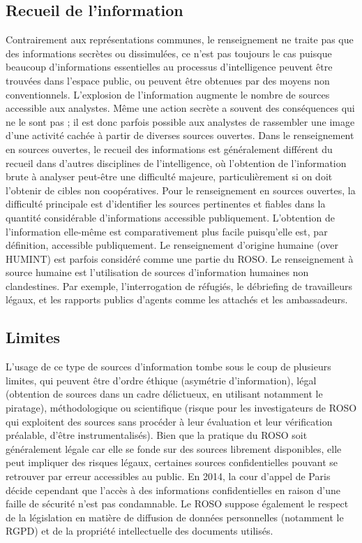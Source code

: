 \documentclass[french]{article}
\begin{document}
\subsection*{Recueil de l'information}
Contrairement aux représentations communes, le renseignement ne traite pas que des informations secrètes ou dissimulées, ce n'est pas toujours le cas puisque beaucoup d'informations essentielles au processus d'intelligence peuvent être trouvées dans l'espace public, ou peuvent être obtenues par des moyens non conventionnels. L'explosion de l'information augmente le nombre de sources accessible aux analystes. Même une action secrète a souvent des conséquences qui ne le sont pas ; il est donc parfois possible aux analystes de rassembler une image d'une activité cachée à partir de diverses sources ouvertes.
Dans le renseignement en sources ouvertes, le recueil des informations est généralement différent du recueil dans d'autres disciplines de l'intelligence, où l'obtention de l'information brute à analyser peut-être une difficulté majeure, particulièrement si on doit l'obtenir de cibles non coopératives. Pour le renseignement en sources ouvertes, la difficulté principale est d'identifier les sources pertinentes et fiables dans la quantité considérable d'informations accessible publiquement. L'obtention de l'information elle-même est comparativement plus facile puisqu'elle est, par définition, accessible publiquement.
Le renseignement d'origine humaine (over HUMINT) est parfois considéré comme une partie du ROSO. Le renseignement à source humaine est l'utilisation de sources d'information humaines non clandestines. Par exemple, l'interrogation de réfugiés, le débriefing de travailleurs légaux, et les rapports publics d'agents comme les attachés et les ambassadeurs.

\subsection*{Limites}
L'usage de ce type de sources d’information tombe sous le coup de plusieurs limites, qui peuvent être d'ordre éthique (asymétrie d'information), légal (obtention de sources dans un cadre délictueux, en utilisant notamment le piratage), méthodologique ou scientifique (risque pour les investigateurs de ROSO qui exploitent des sources sans procéder à leur évaluation et leur vérification préalable, d'être instrumentalisés).
Bien que la pratique du ROSO soit généralement légale car elle se fonde sur des sources librement disponibles, elle peut impliquer des risques légaux, certaines sources confidentielles pouvant se retrouver par erreur accessibles au public. En 2014, la cour d'appel de Paris décide cependant que l'accès à des informations confidentielles en raison d'une faille de sécurité n'est pas condamnable.
Le ROSO suppose également le respect de la législation en matière de diffusion de données personnelles (notamment le RGPD) et de la propriété intellectuelle des documents utilisés.
\end{document}
